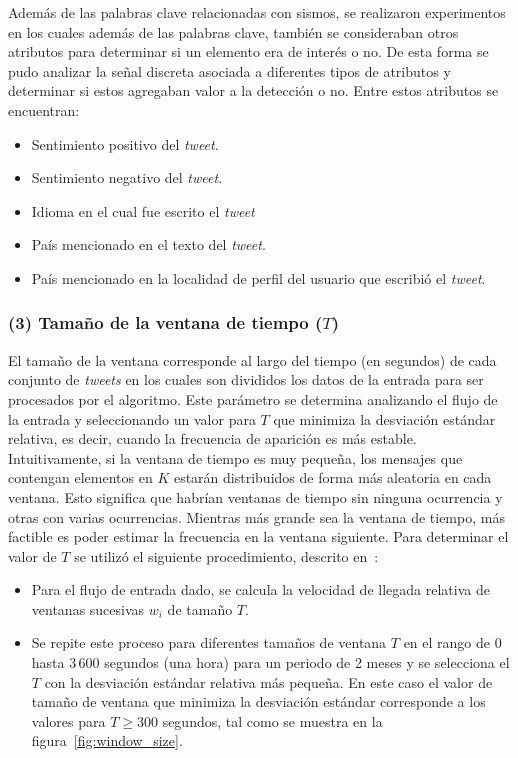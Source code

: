 	
	Además de las palabras clave relacionadas con sismos, se realizaron experimentos en los cuales además de las palabras clave, también se consideraban otros atributos para determinar si un elemento era de interés o no. 
	De esta forma se pudo analizar la señal discreta asociada a diferentes tipos de atributos y determinar si estos agregaban valor a la detección o no. 
	Entre estos atributos se encuentran:
	\begin{itemize}
	\item Sentimiento positivo del \textit{tweet}.
	\item Sentimiento negativo del \textit{tweet}.
	\item Idioma en el cual fue escrito el \textit{tweet}
	\item País mencionado en el texto del \textit{tweet}.
	\item País mencionado en la localidad de perfil del usuario que escribió el \textit{tweet}.
	\end{itemize}

	\subsubsection*{(3) Tamaño de la ventana de tiempo ($T$)} 
	El tamaño de la ventana corresponde al largo del tiempo (en segundos) de cada conjunto de \textit{tweets} en los cuales son divididos los datos de la entrada para ser procesados por el algoritmo.
	Este parámetro se determina analizando el flujo de la entrada y seleccionando un valor para $T$ que minimiza la desviación estándar relativa, es decir, cuando la frecuencia de aparición es más estable. 
	Intuitivamente, si la ventana de tiempo es muy pequeña, los mensajes que contengan elementos en $K$ estarán distribuidos de forma más aleatoria en cada ventana. 	
	Esto significa que habrían ventanas de tiempo sin ninguna ocurrencia y otras con varias ocurrencias.
	Mientras más grande sea la ventana de tiempo, más factible es poder estimar la frecuencia en la ventana siguiente. 
	Para determinar el valor de $T$ se utilizó el siguiente procedimiento, descrito en~\cite{guzman2013line}:

	\begin{itemize}
	\item Para el flujo de entrada dado, se calcula la velocidad de llegada relativa de ventanas sucesivas $w_i$ de tamaño $T$.

	\item Se repite este proceso para diferentes tamaños de ventana $T$ en el rango de $0$ hasta $3\,600$ segundos (una hora) para un periodo de 2 meses y se selecciona el $T$ con la desviación estándar relativa más pequeña. En este caso el valor de tamaño de ventana que minimiza la desviación estándar corresponde a los valores para $T \geq 300$ segundos, tal como se muestra en la figura~\ref{fig:window_size}.

	\end{itemize}
	
